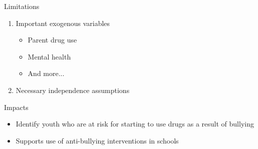 \documentclass[ignorenonframetext,]{beamer}
\providecommand{\tightlist}{%
  \setlength{\itemsep}{0pt}\setlength{\parskip}{0pt}}
\begin{document}
\begin{frame}{Limitations}

\begin{enumerate}
\def\labelenumi{\arabic{enumi}.}
\tightlist
\item
  Important exogenous variables\\

  \begin{itemize}
   \item Parent drug use 
   \item Mental health 
   \item And more...
     \end{itemize}
\item
  Necessary independence assumptions
\end{enumerate}

\end{frame}

\begin{frame}{Impacts}

\begin{itemize}
\item
  Identify youth who are at risk for starting to use drugs as a result
  of bullying
\item
  Supports use of anti-bullying interventions in schools
\end{itemize}

\end{frame}
\end{document}
